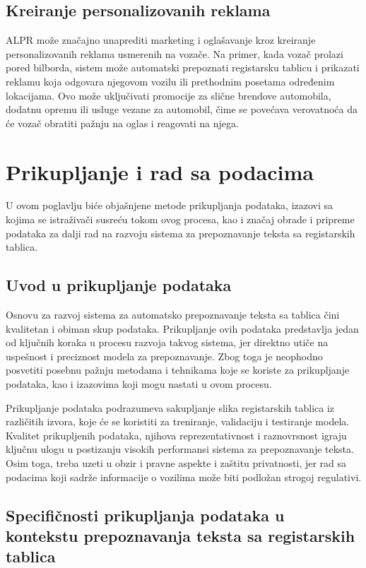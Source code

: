 \documentclass[a4paper,12pt]{article}
\begin{document}
	\subsection{Kreiranje personalizovanih reklama}
	ALPR može značajno unaprediti marketing i oglašavanje kroz kreiranje personalizovanih reklama usmerenih na vozače. Na primer, kada vozač prolazi pored bilborda, sistem može automatski prepoznati registarsku tablicu i prikazati reklamu koja odgovara njegovom vozilu ili prethodnim posetama određenim lokacijama. Ovo može uključivati promocije za slične brendove automobila, dodatnu opremu ili usluge vezane za automobil, čime se povećava verovatnoća da će vozač obratiti pažnju na oglas i reagovati na njega.
	\newpage
	
	\section{Prikupljanje i rad sa podacima}
	U ovom poglavlju biće objašnjene metode prikupljanja podataka, izazovi sa kojima se istraživači susreću tokom ovog procesa, kao i značaj obrade i pripreme podataka za dalji rad na razvoju sistema za prepoznavanje teksta sa registarskih tablica.
	
	\subsection{Uvod u prikupljanje podataka}
	Osnovu za razvoj sistema za automatsko prepoznavanje teksta sa tablica čini kvalitetan i obiman skup podataka. Prikupljanje ovih podataka predstavlja jedan od ključnih koraka u procesu razvoja takvog sistema, jer direktno utiče na uspešnost i preciznost modela za prepoznavanje. Zbog toga je neophodno posvetiti posebnu pažnju metodama i tehnikama koje se koriste za prikupljanje podataka, kao i izazovima koji mogu nastati u ovom procesu.
	
	Prikupljanje podataka podrazumeva sakupljanje slika registarskih tablica iz različitih izvora, koje će se koristiti za treniranje, validaciju i testiranje modela. Kvalitet prikupljenih podataka, njihova reprezentativnost i raznovrsnost igraju ključnu ulogu u postizanju visokih performansi sistema za prepoznavanje teksta. Osim toga, treba uzeti u obzir i pravne aspekte i zaštitu privatnosti, jer rad sa podacima koji sadrže informacije o vozilima može biti podložan strogoj regulativi.
	
	\subsection{Specifičnosti prikupljanja podataka u kontekstu prepoznavanja teksta sa registarskih tablica}
\end{document}
